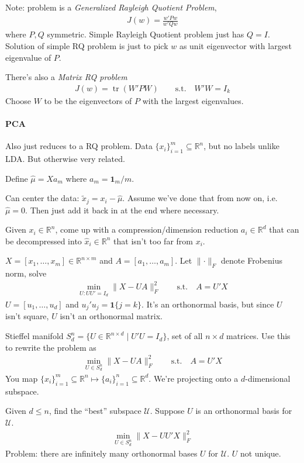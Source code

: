 \documentclass[12pt]{article}
\numberwithin{equation}{section} %
\theoremstyle{plain}
\theoremstyle{definition}
\theoremstyle{remark}
\newcommand{\trace}{\operatorname{tr}}
\newcommand{\calU}{\mathcal{U}}
\newcommand{\R}{\mathbb{R}}
\newcommand{\Rn}{\mathbb{R}^n}
\begin{document}
Note: problem is a \emph{Generalized Rayleigh Quotient Problem},
\begin{align*}
  J(w)=\frac{w'P w}{w'Q w}
\end{align*}
where $P,Q$ symmetric.
Simple Rayleigh Quotient problem just has $Q=I$.
Solution of simple RQ problem is just to pick $w$ as unit eigenvector
with largest eigenvalue of $P$.

There's also a \emph{Matrix RQ problem}
\begin{align*}
  J(w) = \trace(W'PW)
  \qquad\text{s.t.}\quad
  W'W = I_k
\end{align*}
Choose $W$ to be the eigenvectors of $P$ with the largest eigenvalues.


\paragraph{PCA}
Also just reduces to a RQ problem.
Data $\{x_i\}_{i=1}^m\subseteq\Rn$, but no labels unlike LDA. But
otherwise very related.

Define $\hat{\mu}=Xa_m$ where $a_m = \mathbf{1}_m/m$.

Can center the data: $\tilde{x}_j=x_i-\hat{\mu}$.
Assume we've done that from now on, i.e. $\hat{\mu}=0$.
Then just add it back in at the end where necessary.

Given $x_i\in \R^n$, come up with a compression/dimension reduction
$a_i\in\R^d$ that can be decompressed into $\hat{x}_i\in\R^n$ that isn't
too far from $x_i$.

$X=[x_1,\ldots,x_m]\in\R^{n\times m}$ and $A=[a_1,\ldots,a_m]$.
Let $\lVert\cdot\rVert_F$ denote Frobenius norm, solve
\begin{align*}
  \min_{U: UU'=I_d}
  \lVert X-UA\rVert_F^2
  \qquad\text{s.t.}\quad
  A=U'X
\end{align*}
$U=[u_1,\ldots,u_d]$ and $u_j'u_j=\mathbf{1}\{j=k\}$.
It's an orthonormal basis, but since $U$ isn't square, $U$ isn't an
orthonormal matrix.

Stieffel manifold $S_d^n = \{U\in\R^{n\times d}\;|\;U'U=I_d\}$, set of
all $n\times d$ matrices.
Use this to rewrite the problem as
\begin{align*}
  \min_{U\in S_d^n}
  \lVert X-UA\rVert_F^2
  \qquad\text{s.t.}\quad
  A=U'X
\end{align*}
You map
$\{x_i\}_{i=1}^m\subseteq\Rn \mapsto \{a_i\}_{i=1}^n\subseteq\R^d$.
We're projecting onto a $d$-dimensional subspace.


Given $d\leq n$, find the ``best'' subspace $\calU$.
Suppose $U$ is an orthonormal basis for $\calU$.
\begin{align*}
  \min_{U\in S_d^n}
  \lVert X-UU'X\rVert_F^2
\end{align*}
Problem: there are infinitely many orthonormal bases $U$ for $\calU$.
$U$ not unique.
\end{document}
